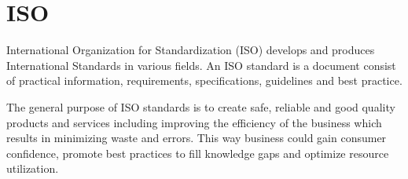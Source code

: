 \section{ISO}


International Organization for Standardization (ISO) develops and produces International Standards in various fields. An ISO standard is a document consist of practical information, requirements, specifications, guidelines and best practice. 


The general purpose of ISO standards is to create safe, reliable and good quality products and services including improving the efficiency of the business which results in minimizing waste and errors. This way business could gain consumer confidence, promote best practices to fill knowledge gaps and optimize resource utilization. %
